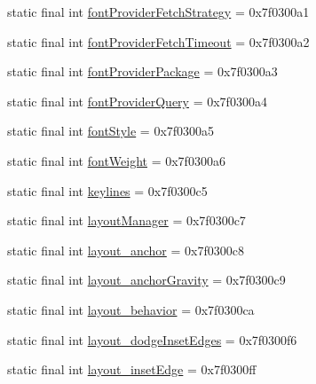 \begin{DoxyCompactItemize}
\item 
static final int \mbox{\hyperlink{classandroid_1_1support_1_1v7_1_1recyclerview_1_1_r_1_1attr_a3defd1f1698fe4775a575c28641cb2a7}{font\+Provider\+Fetch\+Strategy}} = 0x7f0300a1
\item 
static final int \mbox{\hyperlink{classandroid_1_1support_1_1v7_1_1recyclerview_1_1_r_1_1attr_a48a3c42cf50b019f569a0b86e6e4afd7}{font\+Provider\+Fetch\+Timeout}} = 0x7f0300a2
\item 
static final int \mbox{\hyperlink{classandroid_1_1support_1_1v7_1_1recyclerview_1_1_r_1_1attr_ae960c7185302cd8f4ee924994e5b7703}{font\+Provider\+Package}} = 0x7f0300a3
\item 
static final int \mbox{\hyperlink{classandroid_1_1support_1_1v7_1_1recyclerview_1_1_r_1_1attr_ab18473f55a4927e934396f00882127c6}{font\+Provider\+Query}} = 0x7f0300a4
\item 
static final int \mbox{\hyperlink{classandroid_1_1support_1_1v7_1_1recyclerview_1_1_r_1_1attr_a68d79f99d5ce3963517b2758fb38a19d}{font\+Style}} = 0x7f0300a5
\item 
static final int \mbox{\hyperlink{classandroid_1_1support_1_1v7_1_1recyclerview_1_1_r_1_1attr_afd7f9436a411f403861940701bdfd176}{font\+Weight}} = 0x7f0300a6
\item 
static final int \mbox{\hyperlink{classandroid_1_1support_1_1v7_1_1recyclerview_1_1_r_1_1attr_ae01c0914f7e224fe3d418750e7a242e4}{keylines}} = 0x7f0300c5
\item 
static final int \mbox{\hyperlink{classandroid_1_1support_1_1v7_1_1recyclerview_1_1_r_1_1attr_a66e095b5e4bb10f4a6b1adc05e6e0ea1}{layout\+Manager}} = 0x7f0300c7
\item 
static final int \mbox{\hyperlink{classandroid_1_1support_1_1v7_1_1recyclerview_1_1_r_1_1attr_a21d23980cb797f5063a580180313c7ba}{layout\+\_\+anchor}} = 0x7f0300c8
\item 
static final int \mbox{\hyperlink{classandroid_1_1support_1_1v7_1_1recyclerview_1_1_r_1_1attr_ad4bdc473ac16c5ed88a3ca8eb34e9392}{layout\+\_\+anchor\+Gravity}} = 0x7f0300c9
\item 
static final int \mbox{\hyperlink{classandroid_1_1support_1_1v7_1_1recyclerview_1_1_r_1_1attr_a970fafc887738a81b6db70f1669305e7}{layout\+\_\+behavior}} = 0x7f0300ca
\item 
static final int \mbox{\hyperlink{classandroid_1_1support_1_1v7_1_1recyclerview_1_1_r_1_1attr_abb1dcddccac24cb6c905b9b059729f3c}{layout\+\_\+dodge\+Inset\+Edges}} = 0x7f0300f6
\item 
static final int \mbox{\hyperlink{classandroid_1_1support_1_1v7_1_1recyclerview_1_1_r_1_1attr_a1a89883df25e4c0554c0944356ea9e41}{layout\+\_\+inset\+Edge}} = 0x7f0300ff

\end{DoxyCompactItemize}
